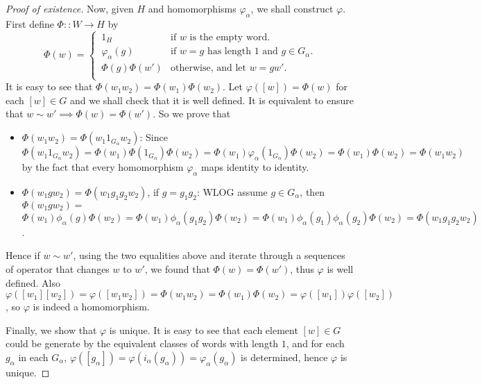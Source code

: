 \documentclass[a4paper,titlepage]{article}
\theoremstyle{remark}
\theoremstyle{definition}
\theoremstyle{theorem}
\begin{document}
\begin{proof}[Proof of existence]
    Now, given $H$ and homomorphisms $\varphi_\alpha$, we shall construct $\varphi$. First define 
    $\Phi :: W \to H$ by
    \[ 
      \Phi(w) =
      \begin{cases}
        \, 1_H & \text{if } w \text{ is the empty word.} \\
        \, \varphi_\alpha(g) & \text{if } w = g \text{ has length 1 and } g \in G_\alpha. \\ 
        \, \Phi(g) \Phi(w') & \text{otherwise, and let } w = g w'. \\ 
      \end{cases}
    \]
    It is easy to see that $\Phi(w_1 w_2) = \Phi(w_1) \Phi(w_2)$. Let $\varphi([w]) = \Phi(w)$ for
    each $[w] \in G$ and we shall check that it is well defined. It is equivalent to
    ensure that $w \sim w' \implies \Phi(w) = \Phi(w')$. So we prove that
    \begin{itemize}
      \item $\Phi(w_1 w_2) = \Phi(w_1 1_{G_\alpha} w_2)$: Since $\Phi(w_1 1_{G_\alpha} w_2) 
        = \Phi(w_1) \Phi(1_{G_\alpha}) \Phi(w_2) = \Phi(w_1) \varphi_\alpha(1_{G_\alpha}) \Phi(w_2)
        = \Phi(w_1) \Phi(w_2) = \Phi(w_1 w_2)$ by the fact that every homomorphism $\varphi_\alpha$ maps
        identity to identity.
      \item $\Phi(w_1 g w_2) = \Phi(w_1 g_1 g_2 w_2)$, if $g = g_1 g_2$: WLOG assume $g \in G_\alpha$, then 
        $\Phi(w_1 g w_2) = $ \\
        $ \Phi(w_1) \phi_\alpha(g) \Phi(w_2) = \Phi(w_1) \phi_\alpha(g_1 g_2) \Phi(w_2)
        = \Phi(w_1) \phi_\alpha(g_1) \phi_\alpha(g_2) \Phi(w_2) = \Phi(w_1 g_1 g_2 w_2)$. 
    \end{itemize}
    Hence if $w \sim w'$, using the two equalities above and iterate through a sequences of
    operator that changes $w$ to $w'$, we found that $\Phi(w) = \Phi(w')$, thus $\varphi$ is
    well defined. Also $\varphi([w_1][w_2]) = \varphi([w_1 w_2]) = \Phi(w_1 w_2) = \Phi(w_1) \Phi(w_2)
    = \varphi([w_1]) \varphi([w_2])$, so $\varphi$ is indeed a homomorphism.

    Finally, we show that $\varphi$ is unique. It is easy to see that each element
    $[w] \in G$ could be generate by the equivalent classes of words with length $1$, 
    and for each $g_\alpha$ in each $G_\alpha$, $\varphi([g_\alpha]) = \varphi(i_\alpha(g_\alpha)) =
    \varphi_\alpha(g_\alpha)$ is determined, hence $\varphi$ is unique.
  \end{proof}
\end{document}
